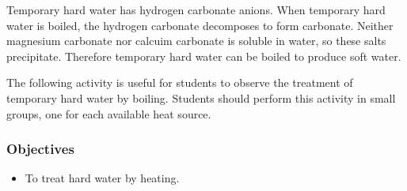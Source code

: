 Temporary hard water has hydrogen carbonate anions. When temporary hard water is boiled, the hydrogen carbonate decomposes to form carbonate. Neither magnesium carbonate nor calcuim carbonate is soluble in water, so these salts precipitate. Therefore temporary hard water can be boiled to produce soft water.

The following activity is useful for students to observe the treatment of temporary hard water by boiling. Students should perform this activity in small groups, one for each available heat source.

\subsubsection*{Objectives}
\begin{itemize}
\item{To treat hard water by heating.}
\end{itemize}

